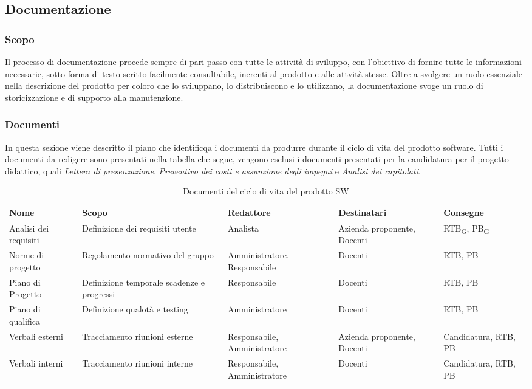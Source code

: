 \subsection{Documentazione}
\subsubsection{Scopo}
Il processo di documentazione procede sempre di pari passo con tutte le attività di sviluppo, con l'obiettivo di fornire tutte le informazioni necessarie, sotto forma di testo scritto facilmente consultabile, inerenti al prodotto e alle attvità stesse. Oltre a svolgere un ruolo essenziale nella descrizione del prodotto per coloro che lo sviluppano, lo distribuiscono e lo utilizzano, la documentazione svoge un ruolo di storicizzazione e di supporto alla manutenzione. 

\subsubsection{Documenti}
In questa sezione viene descritto il piano che identificqa i documenti da produrre durante il ciclo di vita del prodotto software. Tutti i documenti da redigere sono presentati nella tabella che segue, vengono esclusi i documenti presentati per la candidatura per il progetto didattico, quali \textit{Lettera di presenzazione}, \textit{Preventivo dei costi e assunzione degli impegni} e \textit{Analisi dei capitolati}.


\begin{table}[H]
    \centering
   \begin{tabularx}{\textwidth}{X|X|>{\hsize=1.2\hsize}X|X|>{\hsize=0.8\hsize}X}
        \textbf{Nome} & \textbf{Scopo} & \textbf{Redattore} & \textbf{Destinatari} & \textbf{Consegne} \\ \hline
        Analisi dei requisiti    & Definizione dei requisiti utente    & Analista & Azienda proponente, Docenti & RTB\textsubscript{G}, PB\textsubscript{G}    \\ \hline
        Norme di progetto    & Regolamento normativo del gruppo    & Amministratore, Responsabile &  Docenti & RTB, PB    \\ \hline
        Piano di Progetto   & Definizione temporale scadenze e progressi    & Responsabile &  Docenti & RTB, PB   \\ \hline
        Piano di qualifica   & Definizione qualotà e testing    & Amministratore &  Docenti & RTB, PB   \\ \hline
         Verbali esterni   & Tracciamento riunioni esterne   & Responsabile, Amministratore &  Azienda proponente, Docenti & Candidatura, RTB, PB   \\ \hline
         Verbali interni   & Tracciamento riunioni interne   & Responsabile, Amministratore &  Docenti & Candidatura, RTB, PB  
       
    \end{tabularx}
    \caption{Documenti del ciclo di vita del prodotto SW}
\end{table}


